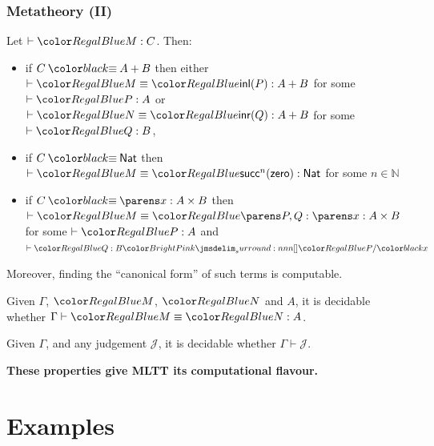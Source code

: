 \documentclass{beamer} %
\begin{document}
\begin{frame}
  \frametitle{Metatheory (II)}
  
  \begin{theorem}[Canonicity]
    Let $\IsTm[]{M}{C}$. Then:
    \begin{itemize}
      \item if $C \deq A + B$ then either $\EqTm[]{M}{\Inl{P}}{A + B}$ for some $\IsTm[]{P}{A}$ or $\EqTm[]{N}{\Inr{Q}}{A + B}$ for some $\IsTm[]{Q}{B}$,
      \item if $C \deq \Nat$ then $\EqTm[]{M}{\textsf{succ}^n(\Zero)}{\Nat}$ for some $n \in \mathbb{N}$
      \item if $C \deq \DSum{x}{A}{B}$ then $\EqTm[]{M}{\Pair{P}{Q}}{\DSum{x}{A}{B}}$ for some $\IsTm[]{P}{A}$ and $\IsTm[]{Q}{\Sb{B}{P}{x}}$
    \end{itemize}
    Moreover, finding the ``canonical form'' of such terms is computable.
  \end{theorem}

  \begin{theorem}[Normalization]
    Given $\Gamma$, $\Tm{M}$, $\Tm{N}$ and $A$, it is decidable whether
    $\EqTm{M}{N}{A}$.
  \end{theorem}
  
  \begin{theorem}[Decidability]
    Given $\Gamma$, and any judgement $\mathcal{J}$, it is decidable whether
    $\Gamma \vdash \mathcal{J}$.
  \end{theorem}
  
  \medskip
  \textbf{These properties give MLTT its computational flavour.}
\end{frame}


\section{Examples}
\end{document}
